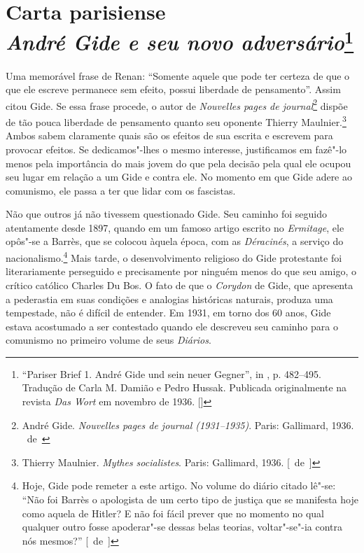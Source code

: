 \chapter{Carta parisiense \\ \emph{André Gide e seu novo adversário}\footnote[*]{``Pariser Brief 1. André Gide und sein neuer Gegner'', in
  , p. 482--495. Tradução de Carla M. Damião e Pedro Hussak. Publicada originalmente na revista \emph{Das Wort} em novembro de 1936. []}}


Uma memorável frase de Renan: ``Somente aquele que pode ter certeza de
que o que ele escreve permanece sem efeito, possui liberdade de
pensamento''. Assim citou Gide. Se essa frase procede, o autor de
\emph{Nouvelles pages de journal}\footnote{André Gide.
  \emph{Nouvelles pages de journal (1931--1935)}. Paris: Gallimard, 1936. \versal{[N.}~de~\versal{W.B.]}}
dispõe de tão pouca liberdade de pensamento quanto seu oponente
Thierry Maulnier.\footnote{Thierry Maulnier. \emph{Mythes
  socialistes}. Paris: Gallimard, 1936. [~de~]} Ambos sabem claramente quais
são os efeitos de sua escrita e escrevem para provocar
efeitos. Se dedicamos"-lhes o mesmo interesse, justificamos em
fazê"-lo menos pela importância do mais jovem do que pela decisão pela
qual ele ocupou seu lugar em relação a um Gide e contra ele. No
momento em que Gide adere ao comunismo, ele passa a ter que lidar com
os fascistas.

Não que outros já não tivessem questionado Gide. Seu caminho foi seguido
atentamente desde 1897, quando em um famoso artigo escrito no
\emph{Ermitage}, ele opôs"-se a Barrès, que se colocou àquela época, com
as \emph{Déracinés}, a serviço do nacionalismo.\footnote{Hoje, Gide
  pode remeter a este artigo. No volume do diário citado lê"-se: ``Não
  foi Barrès o apologista de um certo tipo de justiça que se manifesta
  hoje como aquela de Hitler? E não foi fácil prever que no momento no
  qual qualquer outro fosse apoderar"-se dessas belas teorias,
  voltar"-se"-ia contra nós mesmos?'' [~de~]} Mais tarde, o desenvolvimento
religioso do Gide protestante foi literariamente perseguido e
precisamente por ninguém menos do que seu amigo, o crítico católico
Charles Du Bos. O fato de que o \emph{Corydon} de Gide, que apresenta a pederastia
em suas condições e analogias históricas naturais, produza uma
tempestade, não é difícil de entender. Em 1931, em torno dos 60 anos,
Gide estava acostumado a ser contestado quando ele descreveu seu caminho
para o comunismo no primeiro volume de seus \emph{Diários}.

